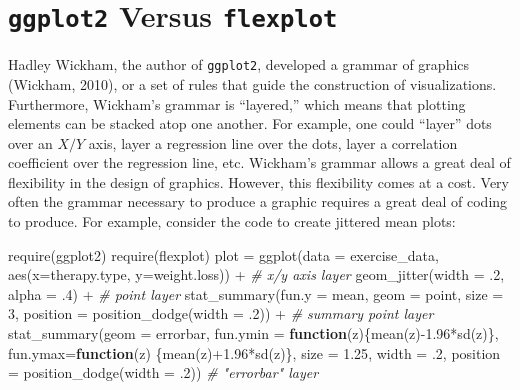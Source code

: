 \documentclass[
  english,
  man]{apa6}
\newenvironment{Shaded}{\begin{snugshade}}{\end{snugshade}}
\newcommand{\AttributeTok}[1]{\textcolor[rgb]{0.77,0.63,0.00}{#1}}
\newcommand{\CommentTok}[1]{\textcolor[rgb]{0.56,0.35,0.01}{\textit{#1}}}
\newcommand{\ControlFlowTok}[1]{\textcolor[rgb]{0.13,0.29,0.53}{\textbf{#1}}}
\newcommand{\DecValTok}[1]{\textcolor[rgb]{0.00,0.00,0.81}{#1}}
\newcommand{\FloatTok}[1]{\textcolor[rgb]{0.00,0.00,0.81}{#1}}
\newcommand{\FunctionTok}[1]{\textcolor[rgb]{0.00,0.00,0.00}{#1}}
\newcommand{\NormalTok}[1]{#1}
\newcommand{\OtherTok}[1]{\textcolor[rgb]{0.56,0.35,0.01}{#1}}
\newcommand{\SpecialCharTok}[1]{\textcolor[rgb]{0.00,0.00,0.00}{#1}}
\newcommand{\StringTok}[1]{\textcolor[rgb]{0.31,0.60,0.02}{#1}}
\begin{document}
\hypertarget{ggplot2-versus-flexplot}{%
\section{\texorpdfstring{\texttt{ggplot2} Versus \texttt{flexplot}}{ggplot2 Versus flexplot}}\label{ggplot2-versus-flexplot}}

Hadley Wickham, the author of \texttt{ggplot2}, developed a grammar of graphics (Wickham, 2010), or a set of rules that guide the construction of visualizations. Furthermore, Wickham's grammar is ``layered,'' which means that plotting elements can be stacked atop one another. For example, one could ``layer'' dots over an \(X/Y\) axis, layer a regression line over the dots, layer a correlation coefficient over the regression line, etc. Wickham's grammar allows a great deal of flexibility in the design of graphics. However, this flexibility comes at a cost. Very often the grammar necessary to produce a graphic requires a great deal of coding to produce. For example, consider the code to create jittered mean plots:

\small

\begin{Shaded}
\begin{Highlighting}[]
\FunctionTok{require}\NormalTok{(ggplot2)}
\FunctionTok{require}\NormalTok{(flexplot)}
\NormalTok{plot }\OtherTok{=} \FunctionTok{ggplot}\NormalTok{(}\AttributeTok{data =}\NormalTok{ exercise\_data, }\FunctionTok{aes}\NormalTok{(}\AttributeTok{x=}\NormalTok{therapy.type, }\AttributeTok{y=}\NormalTok{weight.loss)) }\SpecialCharTok{+} 
      \CommentTok{\# x/y axis layer}
  \FunctionTok{geom\_jitter}\NormalTok{(}\AttributeTok{width =}\NormalTok{ .}\DecValTok{2}\NormalTok{, }\AttributeTok{alpha =}\NormalTok{ .}\DecValTok{4}\NormalTok{) }\SpecialCharTok{+} 
      \CommentTok{\# point layer}
  \FunctionTok{stat\_summary}\NormalTok{(}\AttributeTok{fun.y =} \StringTok{\textquotesingle{}mean\textquotesingle{}}\NormalTok{, }\AttributeTok{geom =} \StringTok{\textquotesingle{}point\textquotesingle{}}\NormalTok{, }
        \AttributeTok{size =} \DecValTok{3}\NormalTok{, }\AttributeTok{position =} \FunctionTok{position\_dodge}\NormalTok{(}\AttributeTok{width =}\NormalTok{ .}\DecValTok{2}\NormalTok{)) }\SpecialCharTok{+} 
      \CommentTok{\# summary point layer}
  \FunctionTok{stat\_summary}\NormalTok{(}\AttributeTok{geom =} \StringTok{\textquotesingle{}errorbar\textquotesingle{}}\NormalTok{, }\AttributeTok{fun.ymin =} \ControlFlowTok{function}\NormalTok{(z)\{}\FunctionTok{mean}\NormalTok{(z)}\SpecialCharTok{{-}}\FloatTok{1.96}\SpecialCharTok{*}\FunctionTok{sd}\NormalTok{(z)\}, }
        \AttributeTok{fun.ymax=}\ControlFlowTok{function}\NormalTok{(z) \{}\FunctionTok{mean}\NormalTok{(z)}\SpecialCharTok{+}\FloatTok{1.96}\SpecialCharTok{*}\FunctionTok{sd}\NormalTok{(z)\}, }
        \AttributeTok{size =} \FloatTok{1.25}\NormalTok{, }\AttributeTok{width =}\NormalTok{ .}\DecValTok{2}\NormalTok{, }\AttributeTok{position =} \FunctionTok{position\_dodge}\NormalTok{(}\AttributeTok{width =}\NormalTok{ .}\DecValTok{2}\NormalTok{))  }
      \CommentTok{\# "errorbar" layer}
\end{Highlighting}
\end{Shaded}
\end{document}
